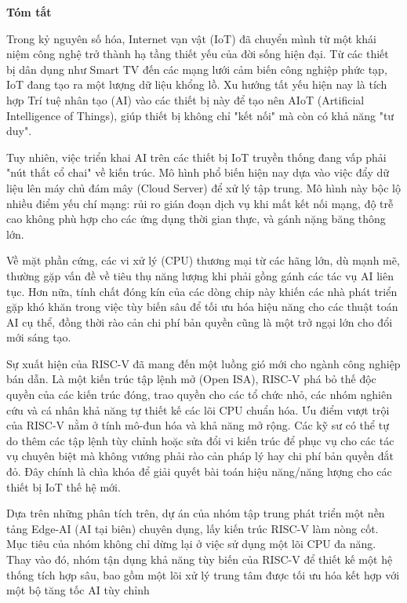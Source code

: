 \vspace{1cm}
\begin{flushright}
    \textbf{\LARGE Tóm tắt}
\end{flushright}
\vspace{1cm}
Trong kỷ nguyên số hóa, Internet vạn vật (IoT) đã chuyển mình từ một khái niệm công nghệ trở thành hạ tầng thiết yếu của đời sống hiện đại. Từ các thiết bị dân dụng như Smart TV đến các mạng lưới cảm biến công nghiệp phức tạp, IoT đang tạo ra một lượng dữ liệu khổng lồ. Xu hướng tất yếu hiện nay là tích hợp Trí tuệ nhân tạo (AI) vào các thiết bị này để tạo nên AIoT (Artificial Intelligence of Things), giúp thiết bị không chỉ "kết nối" mà còn có khả năng "tư duy".

Tuy nhiên, việc triển khai AI trên các thiết bị IoT truyền thống đang vấp phải "nút thắt cổ chai" về kiến trúc. Mô hình phổ biến hiện nay dựa vào việc đẩy dữ liệu lên máy chủ đám mây (Cloud Server) để xử lý tập trung. Mô hình này bộc lộ nhiều điểm yếu chí mạng: rủi ro gián đoạn dịch vụ khi mất kết nối mạng, độ trễ cao không phù hợp cho các ứng dụng thời gian thực, và gánh nặng băng thông lớn.

Về mặt phần cứng, các vi xử lý (CPU) thương mại từ các hãng lớn, dù mạnh mẽ, thường gặp vấn đề về tiêu thụ năng lượng khi phải gồng gánh các tác vụ AI liên tục. Hơn nữa, tính chất đóng kín của các dòng chip này khiến các nhà phát triển gặp khó khăn trong việc tùy biến sâu để tối ưu hóa hiệu năng cho các thuật toán AI cụ thể, đồng thời rào cản chi phí bản quyền cũng là một trở ngại lớn cho đổi mới sáng tạo.

Sự xuất hiện của RISC-V đã mang đến một luồng gió mới cho ngành công nghiệp bán dẫn. Là một kiến trúc tập lệnh mở (Open ISA), RISC-V phá bỏ thế độc quyền của các kiến trúc đóng, trao quyền cho các tổ chức nhỏ, các nhóm nghiên cứu và cá nhân khả năng tự thiết kế các lõi CPU chuẩn hóa. Ưu điểm vượt trội của RISC-V nằm ở tính mô-đun hóa và khả năng mở rộng. Các kỹ sư có thể tự do thêm các tập lệnh tùy chỉnh hoặc sửa đổi vi kiến trúc để phục vụ cho các tác vụ chuyên biệt mà không vướng phải rào cản pháp lý hay chi phí bản quyền đắt đỏ. Đây chính là chìa khóa để giải quyết bài toán hiệu năng/năng lượng cho các thiết bị IoT thế hệ mới.

Dựa trên những phân tích trên, dự án của nhóm tập trung phát triển một nền tảng Edge-AI (AI tại biên) chuyên dụng, lấy kiến trúc RISC-V làm nòng cốt. Mục tiêu của nhóm không chỉ dừng lại ở việc sử dụng một lõi CPU đa năng. Thay vào đó, nhóm tận dụng khả năng tùy biến của RISC-V để thiết kế một hệ thống tích hợp sâu, bao gồm một lõi xử lý trung tâm được tối ưu hóa kết hợp với một bộ tăng tốc AI tùy chỉnh
